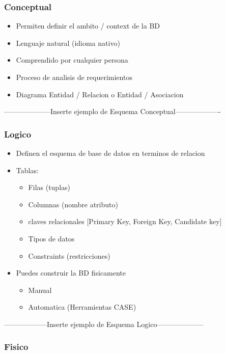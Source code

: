 \documentclass[twoside]{article}
\begin{document}
\subsubsection{Conceptual}

\begin{itemize}
  \item Permiten definir el ambito / context de la BD
  \item Lenguaje natural (idioma nativo)
  \item Comprendido por cualquier persona
  \item Proceso de analisis de requerimientos
  \item Diagrama Entidad / Relacion o Entidad / Asociacion
\end{itemize}

--------------------Inserte ejemplo de Esquema Conceptual-------------------

\subsubsection{Logico}

\begin{itemize}
  \item Definen el esquema de base de datos en terminos de relacion
  \item Tablas:
  \begin{itemize}
    \item Filas (tuplas)
    \item Columnas (nombre \rightarrow atributo)
    \item claves relacionales [Primary Key, Foreign Key, Candidate key]
    \item Tipos de datos
    \item Constraints (restricciones)
  \end{itemize}
  \item Puedes construir la BD fisicamente
  \begin{itemize}
    \item Manual
    \item Automatica (Herramientas CASE)
  \end{itemize}
\end{itemize}

------------------Inserte ejemplo de Esquema Logico--------------------

\subsubsection{Fisico}
\end{document}
